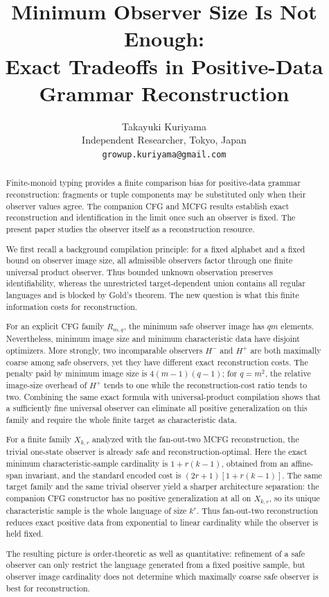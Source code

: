 \documentclass[11pt]{article}
\title{Minimum Observer Size Is Not Enough:\\
Exact Tradeoffs in Positive-Data Grammar Reconstruction}
\author{Takayuki Kuriyama\\Independent Researcher, Tokyo, Japan\\\texttt{growup.kuriyama@gmail.com}}
\date{}
\theoremstyle{definition}
\theoremstyle{remark}
\begin{document}
\maketitle

\begin{abstract}
Finite-monoid typing provides a finite comparison bias for positive-data
grammar reconstruction: fragments or tuple components may be substituted only
when their observer values agree.  The companion CFG and MCFG results establish
exact reconstruction and identification in the limit once such an observer is
fixed.  The present paper studies the observer itself as a reconstruction
resource.

We first recall a background compilation principle: for a fixed alphabet and a
fixed bound on observer image size, all admissible observers factor through one
finite universal product observer.  Thus bounded unknown observation preserves
identifiability, whereas the unrestricted target-dependent union contains all
regular languages and is blocked by Gold's theorem.  The new question is what
this finite information costs for reconstruction.

For an explicit CFG family \(R_{m,q}\), the minimum safe observer image has
\(qm\) elements.  Nevertheless, minimum image size and minimum characteristic
data have disjoint optimizers.  More strongly, two incomparable observers
\(H^-\) and \(H^+\) are both maximally coarse among safe observers, yet they have
different exact reconstruction costs.  The penalty paid by minimum image size
is \(4(m-1)(q-1)\); for \(q=m^2\), the relative image-size overhead of \(H^+\)
tends to one while the reconstruction-cost ratio tends to two.  Combining the
same exact formula with universal-product compilation shows that a sufficiently
fine universal observer can eliminate all positive generalization on this
family and require the whole finite target as characteristic data.

For a finite family \(X_{k,r}\) analyzed with the fan-out-two MCFG
reconstruction, the trivial one-state observer is already safe and
reconstruction-optimal.  Here the exact minimum characteristic-sample
cardinality is \(1+r(k-1)\), obtained from an affine-span invariant, and the
standard encoded cost is \((2r+1)[1+r(k-1)]\).  The same target family and
the same trivial observer yield a sharper architecture separation: the
companion CFG constructor has no positive generalization at all on
\(X_{k,r}\), so its unique characteristic sample is the whole language of
size \(k^r\).  Thus fan-out-two reconstruction reduces exact positive data
from exponential to linear cardinality while the observer is held fixed.

The resulting picture is order-theoretic as well as quantitative: refinement
of a safe observer can only restrict the language generated from a fixed
positive sample, but observer image cardinality does not determine which
maximally coarse safe observer is best for reconstruction.
\end{abstract}
\end{document}
